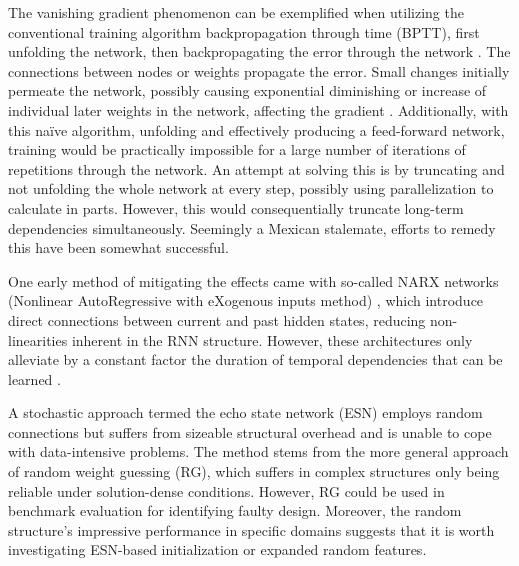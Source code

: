 The vanishing gradient phenomenon can be exemplified when utilizing the conventional training algorithm backpropagation through time (BPTT), first unfolding the network, then backpropagating the error through the network \cite{DRNNS}. The connections between nodes or weights propagate the error. Small changes initially permeate the network, possibly causing exponential diminishing or increase of individual later weights in the network, affecting the gradient \cite{field}. Additionally, with this naïve algorithm, unfolding and effectively producing a feed-forward network, training would be practically impossible for a large number of iterations of repetitions through the network. An attempt at solving this is by truncating and not unfolding the whole network at every step, possibly using parallelization to calculate in parts. However, this would consequentially truncate long-term dependencies simultaneously. Seemingly a Mexican stalemate, efforts to remedy this have been somewhat successful. 

One early method of mitigating the effects came with so-called NARX networks (Nonlinear AutoRegressive with eXogenous inputs method) \cite{DRNNS}, which introduce direct connections between current and past hidden states, reducing non-linearities inherent in the RNN structure. However, these architectures only alleviate by a constant factor the duration of temporal dependencies that can be learned \cite{suts}.

A stochastic approach termed the echo state network (ESN) employs random connections but suffers from sizeable structural overhead and is unable to cope with data-intensive problems. The method stems from the more general approach of random weight guessing (RG), which suffers in complex structures only being reliable under solution-dense conditions. However, RG could be used in benchmark evaluation for identifying faulty design. Moreover, the random structure's impressive performance in specific domains suggests that it is worth investigating ESN-based initialization \cite{suts} or expanded random features. 


